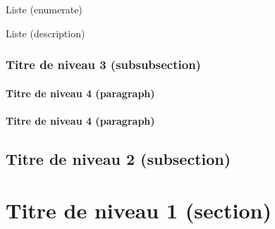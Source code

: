 \medskip
Liste (enumerate)
\blindenumerate

\medskip
Liste (description)
\blinddescription

		\subsubsection{Titre de niveau 3 (subsubsection)}
\paragraph{Titre de niveau 4 (paragraph)} \blindtext

\paragraph{Titre de niveau 4 (paragraph)} \blindtext

	\subsection{Titre de niveau 2 (subsection)}
\blindtext


\section{Titre de niveau 1 (section)}
\blindtext


\clearpage
\thispagestyle{empty}